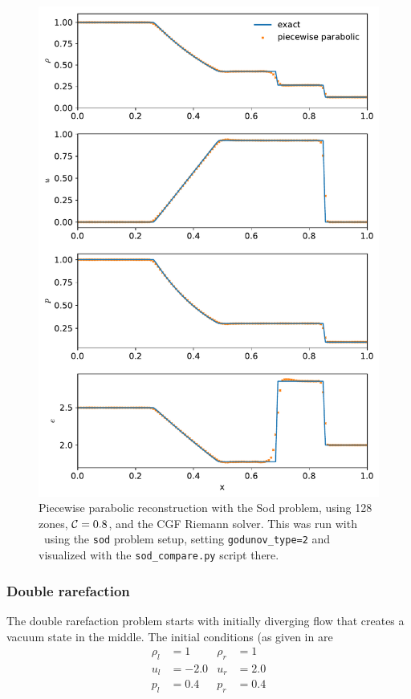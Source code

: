 \begin{figure}[t]
\centering
\includegraphics[width=0.7\linewidth]{hydro1d_ppm_sod}
\caption[Piecewise parabolic reconstruction Sod problem]{\label{fig:Euler:sod:ppm} Piecewise parabolic reconstruction
  with the Sod problem, using 128 zones, ${\mathcal{C}} = 0.8$, and the CGF
  Riemann solver.  This was run with \hydrooned\ using the {\tt sod}
  problem setup, setting {\tt godunov\_type=2} and visualized with the
  {\tt sod\_compare.py} script there.}
\end{figure}


\subsubsection{Double rarefaction}

The double rarefaction problem starts with initially diverging flow
that creates a vacuum state in the middle.  The initial conditions (as
given in \cite{toro:1997} are
\begin{align}
\rho_l &= 1      &  \rho_r &= 1 \nonumber \\
u_l    &= -2.0   &  u_r    &= 2.0   \\
p_l    &= 0.4    &  p_r    &= 0.4 \nonumber
\end{align}


